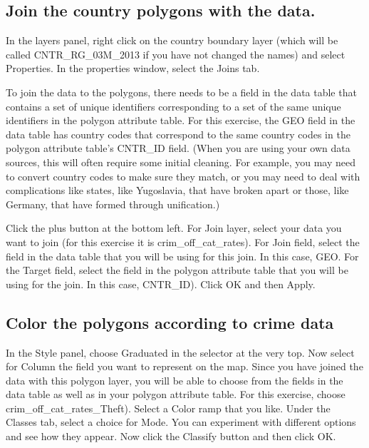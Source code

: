 \documentclass[]{book}
\begin{document}
\hypertarget{join-the-country-polygons-with-the-data.}{%
\subsection{Join the country polygons with the data.}\label{join-the-country-polygons-with-the-data.}}

In the layers panel, right click on the country boundary layer (which will be called CNTR\_RG\_03M\_2013 if you have not changed the names) and select Properties. In the properties window, select the Joins tab.

To join the data to the polygons, there needs to be a field in the data table that contains a set of unique identifiers corresponding to a set of the same unique identifiers in the polygon attribute table. For this exercise, the GEO field in the data table has country codes that correspond to the same country codes in the polygon attribute table's CNTR\_ID field. (When you are using your own data sources, this will often require some initial cleaning. For example, you may need to convert country codes to make sure they match, or you may need to deal with complications like states, like Yugoslavia, that have broken apart or those, like Germany, that have formed through unification.)

Click the plus button at the bottom left. For Join layer, select your data you want to join (for this exercise it is crim\_off\_cat\_rates). For Join field, select the field in the data table that you will be using for this join. In this case, GEO. For the Target field, select the field in the polygon attribute table that you will be using for the join. In this case, CNTR\_ID). Click OK and then Apply.

\hypertarget{color-the-polygons-according-to-crime-data}{%
\subsection{Color the polygons according to crime data}\label{color-the-polygons-according-to-crime-data}}

In the Style panel, choose Graduated in the selector at the very top. Now select for Column the field you want to represent on the map. Since you have joined the data with this polygon layer, you will be able to choose from the fields in the data table as well as in your polygon attribute table. For this exercise, choose crim\_off\_cat\_rates\_Theft). Select a Color ramp that you like. Under the Classes tab, select a choice for Mode. You can experiment with different options and see how they appear. Now click the Classify button and then click OK.
\end{document}
